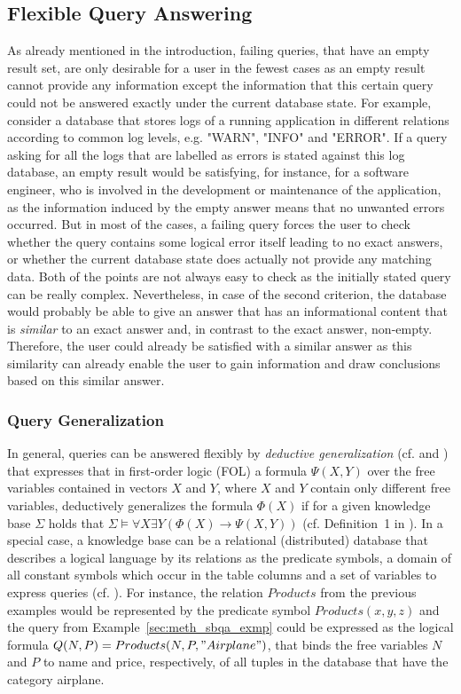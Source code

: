 \subsection{Flexible Query Answering}
\label{sec:meth_fqa}

As already mentioned in the introduction, failing queries, that have an empty result set, are only desirable for a user in the fewest cases as an empty
result cannot provide any information except the information that this certain query could not be answered exactly under the current database state. For
example, consider a database that stores logs of a running application in different relations according to common log levels, e.g. "WARN", "INFO" and
"ERROR". If a query asking for all the logs that are labelled as errors is stated against this log database, an empty result would be satisfying, for 
instance, for a software engineer, who is involved in the development or maintenance of the application, as the information induced by the empty answer 
means that no unwanted errors occurred. But in most of the cases, a failing query forces the user to check whether the query contains some logical error
itself leading to no exact answers, or whether the current database state does actually not provide any matching data. Both of the points are not always
easy to check as the initially stated query can be really complex. Nevertheless, in case of the second criterion, the database would probably be able to
give an answer that has an informational content that is \emph{similar} to an exact answer and, in contrast to the exact answer, non-empty. Therefore, the
user could already be satisfied with a similar answer as this similarity can already enable the user to gain information and draw conclusions based on this
similar answer.

\subsubsection{Query Generalization}
\label{sec:meth_fqa_qgen}
In general, queries can be answered flexibly by \emph{deductive generalization} (cf. \citet{Gaasterland1992} and \citet{Wiese2014}) that expresses that in first-order logic
(FOL) a formula $\Psi(X,Y)$ over the free variables contained in vectors $X$ and $Y$, where $X$ and $Y$ contain only different free variables, deductively
generalizes the formula $\Phi(X)$ if for a given knowledge base $\Sigma$ holds that $\Sigma \vDash \forall X \exists Y (\Phi(X) \to \Psi(X,Y))$ 
(cf. Definition~1 in \citet{Wiese2014}). In a special case, a knowledge base can be a relational (distributed) database that describes a logical language by
its relations as the predicate symbols, a domain of all constant symbols which occur in the table columns and a set of variables to express queries 
(cf. \citet{Wiese2014}). For instance, the relation $Products$ from the previous examples would be represented by the predicate symbol $Products(x,y,z)$
and the query from Example~\ref{sec:meth_sbqa_exmp} could be expressed as the logical formula $Q(N,P)=Products(N,P,"Airplane")$, that binds the free 
variables $N$ and $P$ to name and price, respectively, of all tuples in the database that have the category airplane. 

